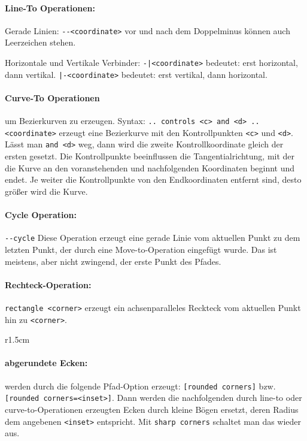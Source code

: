 \documentclass[a4paper,ngerman,10pt]{scrartcl}
\begin{document}
\paragraph*{Line-To Operationen:}
Gerade Linien: \verb!--<coordinate>! vor und nach dem Doppelminus können auch Leerzeichen stehen.

Horizontale und Vertikale Verbinder: \verb!-|<coordinate>! bedeutet: erst horizontal, dann vertikal. \verb!|-<coordinate>! bedeutet: erst vertikal, dann horizontal.

\paragraph*{Curve-To Operationen} um Bezierkurven zu erzeugen. Syntax: \texttt{.. controls <c> and <d> .. <coordinate>} erzeugt eine Bezierkurve mit den Kontrollpunkten \verb!<c>! und \verb!<d>!. Lässt man \verb!and <d>! weg, dann wird die zweite Kontrollkoordinate gleich der ersten gesetzt. Die Kontrollpunkte beeinflussen die Tangentialrichtung, mit der die Kurve an den voranstehenden und nachfolgenden Koordinaten beginnt und endet. Je weiter die Kontrollpunkte von den Endkoordinaten entfernt sind, desto größer wird die Kurve.

\paragraph*{Cycle Operation:} \verb!--cycle! Diese Operation erzeugt eine gerade Linie vom aktuellen Punkt zu dem letzten Punkt, der durch eine Move-to-Operation eingefügt wurde. Das ist meistens, aber nicht zwingend, der erste Punkt des Pfades.

\paragraph*{Rechteck-Operation:} \verb!rectangle <corner>!  erzeugt ein achsenparalleles Reckteck vom aktuellen Punkt hin zu \verb!<corner>!.


\begin{wrapfigure}{r}{1.5cm}\end{wrapfigure}

\paragraph*{abgerundete Ecken:} werden durch die folgende Pfad-Option erzeugt: \verb![rounded corners]! bzw. \verb![rounded corners=<inset>]!. Dann werden die nachfolgenden durch line-to oder curve-to-Operationen erzeugten Ecken durch kleine Bögen ersetzt, deren Radius dem angebenen \verb!<inset>! entspricht. Mit \verb!sharp corners! schaltet man das wieder aus.
\end{document}
